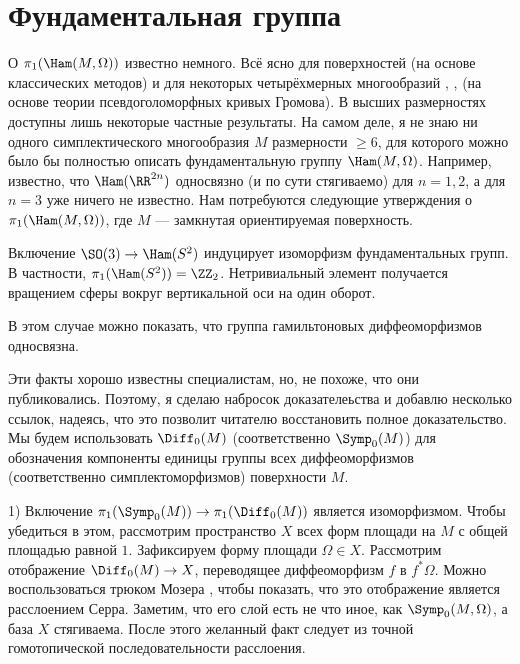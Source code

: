 \section{Фундаментальная группа}
О $\pi_1 (\Ham (M, \Omega))$ известно немного.
Всё ясно для поверхностей (на основе классических методов) и для некоторых четырёхмерных многообразий \cite{G1}, \cite{A}, \cite{AM} (на основе теории псевдоголоморфных кривых Громова).
В высших размерностях доступны лишь некоторые частные результаты.
На самом деле, я не знаю ни одного симплектического многообразия $M$ размерности $\ge 6$, для которого можно было бы полностью описать фундаментальную группу $\Ham (M, \Omega)$.
Например, известно, что $\Ham (\RR^{2n})$ односвязно (и по сути стягиваемо) для $n = 1, 2$, а для $n = 3$ уже ничего не известно.
Нам потребуются следующие утверждения о $\pi_1 (\Ham (M, \Omega))$, где $M$ --- замкнутая ориентируемая поверхность.

\begin{thm}{}\label{7.2.A}
Включение $\SO (3) \to \Ham (S^2)$ индуцирует изоморфизм фундаментальных групп.
В частности, $\pi_1 (\Ham (S^2))=\ZZ_2$.
Нетривиальный элемент получается вращением сферы вокруг вертикальной оси на один оборот.
\end{thm}

\begin{thm}{}
\label{7.2.B}
В этом случае можно показать, что группа гамильтоновых диффеоморфизмов односвязна.
\end{thm}

Эти факты хорошо известны специалистам, но, не похоже, что они публиковались.
Поэтому, я сделаю набросок доказателеьства и добавлю несколько ссылок,
надеясь, что это позволит читателю восстановить полное доказательство.
Мы будем использовать $\Diff_0 (M)$ (соответственно $\Symp_0 (M)$) для обозначения компоненты единицы группы всех диффеоморфизмов (соответственно симплектоморфизмов) поверхности $M$.


1) Включение $\pi_1 (\Symp_0 (M)) \to \pi_1 (\Diff_0 (M))$ является изоморфизмом.
Чтобы убедиться в этом, рассмотрим пространство $X$ всех форм площади на $M$ с общей площадью равной $1$.
Зафиксируем форму площади $\Omega \in X$.
Рассмотрим отображение $\Diff_0 (M) \to X$, переводящее диффеоморфизм $f$ в $f^\ast \Omega$.
Можно воспользоваться трюком Мозера \cite[p. 94--95]{MS}, чтобы показать, что это отображение является расслоением Серра.
Заметим, что его слой есть не что иное, как $\Symp_0 (M, \Omega)$, а база $X$ стягиваема.
После этого желанный факт следует из точной гомотопической последовательности расслоения.

